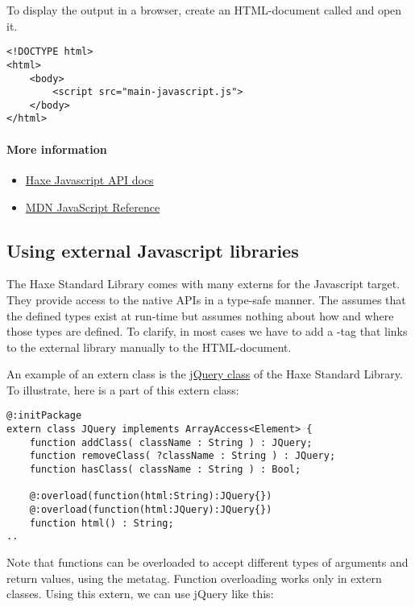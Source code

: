 To display the output in a browser, create an HTML-document called  and open it.

\begin{lstlisting}
<!DOCTYPE html>
<html>
	<body>
		<script src="main-javascript.js">
	</body>
</html>
\end{lstlisting}

\paragraph{More information}

\begin{itemize}
	\item \href{http://api.haxe.org/js/}{Haxe Javascript API docs}
	\item \href{https://developer.mozilla.org/en-US/docs/Web/JavaScript/Reference}{MDN JavaScript Reference}
\end{itemize}

\subsection{Using external Javascript libraries}
\label{target-javascript-external-libraries}

The Haxe Standard Library comes with many externs for the Javascript target. They provide access to the native APIs in a type-safe manner.
The  assumes that the defined types exist at run-time but assumes nothing about how and where those types are defined. 
To clarify, in most cases we have to add a -tag that links to the external library manually to the HTML-document.


An example of an extern class is the \href{https://github.com/HaxeFoundation/haxe/blob/development/std/js/JQuery.hx#L83}{jQuery class} of the Haxe Standard Library. 
To illustrate, here is a part of this extern class:

\begin{lstlisting}
@:initPackage
extern class JQuery implements ArrayAccess<Element> {
	function addClass( className : String ) : JQuery;
	function removeClass( ?className : String ) : JQuery;
	function hasClass( className : String ) : Bool;
	
	@:overload(function(html:String):JQuery{})
	@:overload(function(html:JQuery):JQuery{})
	function html() : String;
..
\end{lstlisting}

Note that functions can be overloaded to accept different types of arguments and return values, using the  metatag. Function overloading works only in extern classes.
Using this extern, we can use jQuery like this:

